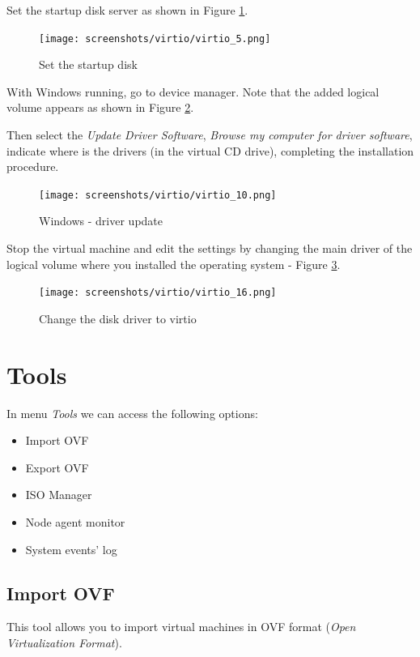 Set the startup disk server as shown in Figure \ref{fig:virtio5}.

\begin{figure}[H]
	\begin{center}
	\texttt{[image: screenshots/virtio/virtio\_5.png]}
	\caption{Set the startup disk}
	\label{fig:virtio5}
	\end{center}
\end{figure}

With Windows running, go to device manager. Note that the added logical volume appears as shown in Figure \ref{fig:virtio10}.

Then select the \textit{Update Driver Software}, \textit{Browse my computer for driver software}, indicate where is the drivers (in the virtual CD drive), completing the installation procedure.

\begin{figure}[H]
	\begin{center}
	\texttt{[image: screenshots/virtio/virtio\_10.png]}
	\caption{Windows - driver update}
	\label{fig:virtio10}
	\end{center}
\end{figure}

Stop the virtual machine and edit the settings by changing the main driver of the logical volume where you installed the operating system - Figure \ref{fig:virtio16}.

\begin{figure}[H]
	\begin{center}
	\texttt{[image: screenshots/virtio/virtio\_16.png]}
	\caption{Change the disk driver to virtio}
	\label{fig:virtio16}
	\end{center}
\end{figure}

\section{Tools}

In menu \emph{Tools} we can access the following options:
\begin{itemize}
\item Import OVF
\item Export OVF
\item ISO Manager
\item Node agent monitor
\item System events' log
\end{itemize}

\subsection{Import OVF}
This tool allows you to import virtual machines in OVF format (\emph{Open Virtualization Format}).

